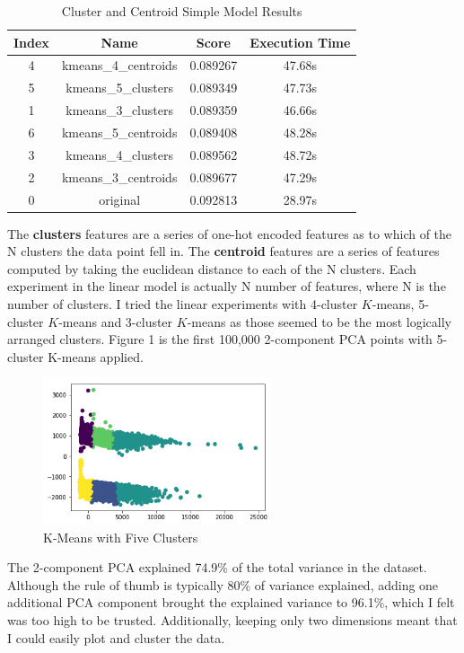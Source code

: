 \documentclass[11pt]{article}
\begin{document}
\begin{table}[h]
 \centering
 \caption{Cluster and Centroid Simple Model Results}
 \begin{tabular}{||c c c c||} 
 \hline
 Index & Name & Score & Execution Time \\ [0.5ex] 
 \hline\hline
 4 & kmeans\_4\_centroids & 0.089267 &	47.68s \\ 
 \hline
 5 & kmeans\_5\_clusters & 0.089349 & 47.73s \\
 \hline
 1 & kmeans\_3\_clusters & 0.089359 &	46.66s \\
 \hline
 6 & kmeans\_5\_centroids & 0.089408 &	48.28s \\
 \hline
 3 & kmeans\_4\_clusters & 0.089562 & 48.72s \\
 \hline
 2 & kmeans\_3\_centroids & 0.089677 & 47.29s \\
 \hline
 0 & original &	0.092813 & 28.97s \\ 
 \hline
\end{tabular}
\end{table}

The \textbf{clusters} features are a series of one-hot encoded features as to which of the N clusters the data point 
fell in. The \textbf{centroid} features are a series of features computed by taking the euclidean distance to each of 
the N clusters. Each experiment in the linear model is actually N number of features, where N is the number of clusters.
I tried the linear experiments with 4-cluster $K$-means, 5-cluster $K$-means and 3-cluster $K$-means as those seemed 
to be the most logically arranged clusters. Figure 1 is the first 100,000 2-component PCA points with 5-cluster K-means
applied.

\begin{figure}[h]
\caption{K-Means with Five Clusters}
\includegraphics[width=0.6\textwidth]{clusters.png}
\centering
\end{figure}

The 2-component PCA explained 74.9\% of the total variance in the dataset. Although the rule of thumb is typically 80\% of
variance explained, adding one additional PCA component brought the explained variance to 96.1\%, which I felt was too high
to be trusted. Additionally, keeping only two dimensions meant that I could easily plot and cluster the data.
\end{document}
